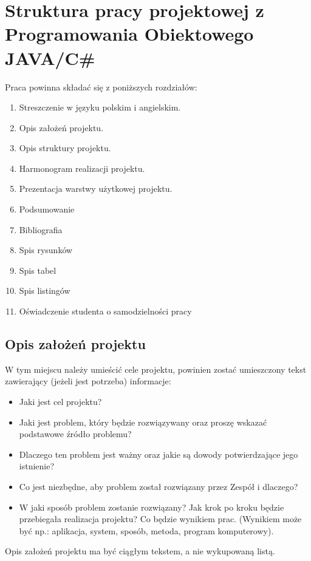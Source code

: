 \chapter{Struktura pracy projektowej z Programowania Obiektowego JAVA/C\#}
\label{cha:elementyPracyproj}

Praca powinna składać się z poniższych rozdziałów: 
\begin{enumerate}
    \item Streszczenie w języku polskim i angielskim.
    \item Opis założeń projektu.
    \item Opis struktury projektu.
    \item Harmonogram realizacji projektu.
    \item Prezentacja warstwy użytkowej projektu.
    \item Podsumowanie
    \item Bibliografia
    \item Spis rysunków
    \item Spis tabel
    \item Spis listingów
    \item Oświadczenie studenta o samodzielności pracy 
\end{enumerate}


\section{Opis założeń projektu}
W tym miejscu należy umieścić cele projektu, powinien zostać umieszczony tekst zawierający (jeżeli jest potrzeba) informacje: 
\begin{itemize}
    \item Jaki jest cel projektu?
    \item Jaki jest problem, który będzie rozwiązywany oraz proszę wskazać podstawowe źródło problemu?
    \item Dlaczego ten problem jest ważny oraz jakie są dowody potwierdzające jego istnienie?
    \item Co jest niezbędne, aby problem został rozwiązany przez Zespół i dlaczego?
    \item W jaki sposób problem zostanie rozwiązany? Jak krok po kroku będzie przebiegała realizacja projektu? Co będzie wynikiem prac. (Wynikiem może być np.: aplikacja, system, sposób, metoda, program komputerowy).
\end{itemize}

\noindent Opis założeń projektu ma być ciągłym tekstem, a nie wykupowaną listą.


